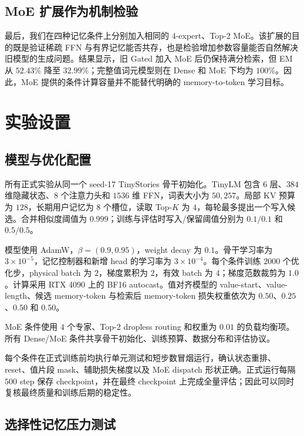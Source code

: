 \documentclass[letterpaper]{article}
\begin{document}
\subsection{MoE 扩展作为机制检验}

最后，我们在四种记忆条件上分别加入相同的 $4$-expert、Top-2 MoE。该扩展的目的既是验证稀疏 FFN 与有界记忆能否共存，也是检验增加参数容量能否自然解决旧模型的生成问题。结果显示，旧 Gated 加入 MoE 后仍保持满分检索，但 EM 从 $52.43\%$ 降至 $32.99\%$；完整值词元模型则在 Dense 和 MoE 下均为 $100\%$。因此，MoE 提供的条件计算容量并不能替代明确的 memory-to-token 学习目标。

\section{实验设置}

\subsection{模型与优化配置}

所有正式实验从同一个 seed-17 TinyStories 骨干初始化。TinyLM 包含 $6$ 层、$384$ 维隐藏状态、$8$ 个注意力头和 $1536$ 维 FFN，词表大小为 $50{,}257$。局部 KV 预算为 $128$，长期用户记忆为 $8$ 个槽位，读取 Top-$K$ 为 $4$，每轮最多提出一个写入候选。合并相似度阈值为 $0.999$；训练与评估时写入/保留阈值分别为 $0.1/0.1$ 和 $0.5/0.5$。

模型使用 AdamW，$\beta=(0.9,0.95)$，weight decay 为 $0.1$。骨干学习率为 $3\times10^{-5}$，记忆控制器和新增 head 的学习率为 $3\times10^{-4}$。每个条件训练 $2000$ 个优化步，physical batch 为 $2$，梯度累积为 $2$，有效 batch 为 $4$；梯度范数裁剪为 $1.0$。计算采用 RTX 4090 上的 BF16 autocast。值对齐模型的 value-start、value-length、候选 memory-token 与检索后 memory-token 损失权重依次为 $0.50$、$0.25$、$0.50$ 和 $0.50$。

MoE 条件使用 $4$ 个专家、Top-2 dropless routing 和权重为 $0.01$ 的负载均衡项。所有 Dense/MoE 条件共享骨干初始化、训练预算、数据分布和评估协议。

每个条件在正式训练前均执行单元测试和短步数冒烟运行，确认状态重排、reset、值片段 mask、辅助损失梯度以及 MoE dispatch 形状正确。正式运行每隔 $500$ step 保存 checkpoint，并在最终 checkpoint 上完成全量评估；因此可以同时复核最终质量和训练后期的稳定性。

\subsection{选择性记忆压力测试}
\end{document}
